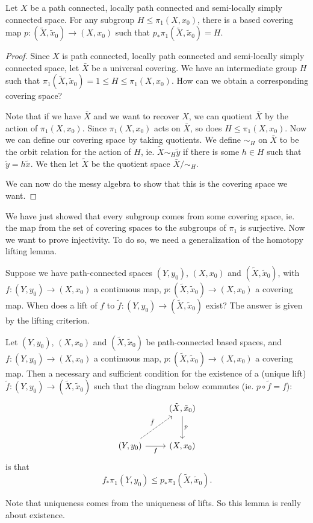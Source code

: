 \documentclass[a4paper]{article}
\begin{document}
\begin{prop}
  Let $X$ be a path connected, locally path connected and semi-locally simply connected space. For any subgroup $H \leq \pi_1(X, x_0)$, there is a based covering map $p: (\tilde{X}, \tilde{x}_0)\to (X, x_0)$ such that $p_* \pi_1(\tilde{X}, \tilde{x}_0) = H$.
\end{prop}

\begin{proof}
  Since $X$ is path connected, locally path connected and semi-locally simply connected space, let $\bar{X}$ be a universal covering. We have an intermediate group $H$ such that $\pi_1(\tilde{X}, \tilde{x}_0) = 1 \leq H \leq \pi_1(X, x_0)$. How can we obtain a corresponding covering space?

  Note that if we have $\bar{X}$ and we want to recover $X$, we can quotient $\bar{X}$ by the action of $\pi_1(X, x_0)$. Since $\pi_1(X, x_0)$ acts on $\bar{X}$, so does $H \leq \pi_1(X, x_0)$. Now we can define our covering space by taking quotients. We define $\sim_H$ on $\bar{X}$ to be the orbit relation for the action of $H$, ie. $\tilde{X} \sim_H \tilde{y}$ if there is some $h \in H$ such that $\tilde{y} = h\tilde{x}$. We then let $\tilde{X}$ be the quotient space $\bar{X}/{\sim_H}$.

  We can now do the messy algebra to show that this is the covering space we want. %
\end{proof}
We have just showed that every subgroup comes from some covering space, ie. the map from the set of covering spaces to the subgroups of $\pi_1$ is surjective. Now we want to prove injectivity. To do so, we need a generalization of the homotopy lifting lemma.

Suppose we have path-connected spaces $(Y, y_0)$, $(X, x_0)$ and $(\tilde{X}, \tilde{x}_0)$, with $f: (Y, y_0) \to (X, x_0)$ a continuous map, $p: (\tilde{X}, \tilde{x}_0) \to (X, x_0)$ a covering map. When does a lift of $f$ to $\tilde{f}: (Y, y_0) \to (\tilde{X}, \tilde{x}_0)$ exist? The answer is given by the lifting criterion.

\begin{lemma}
  Let $(Y, y_0)$, $(X, x_0)$ and $(\tilde{X}, \tilde{x}_0)$ be path-connected based spaces, and $f: (Y, y_0) \to (X, x_0)$ a continuous map, $p: (\tilde{X}, \tilde{x}_0) \to (X, x_0)$ a covering map. Then a necessary and sufficient condition for the existence of a (unique lift) $\tilde{f}: (Y, y_0) \to (\tilde{X}, \tilde{x}_0)$ such that the diagram below commutes (ie. $p\circ \tilde{f} = f$):
  \[
    \begin{tikzcd}[row sep=large]
      & (\tilde{X}, \tilde{x}_0) \ar[d, "p"]\\
      (Y, y_0) \ar [r, "f"'] \ar [ru, dashed, "\tilde{f}"] & (X, x_0)
    \end{tikzcd}
  \]
  is that
  \[
    f_* \pi_1(Y, y_0) \leq p_*\pi_1(\tilde{X}, \tilde{x}_0).
  \]
\end{lemma}
Note that uniqueness comes from the uniqueness of lifts. So this lemma is really about existence.
\end{document}

